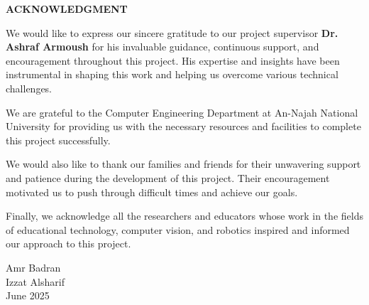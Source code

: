 \begin{center}
    \Large \textbf{ACKNOWLEDGMENT}
    \end{center}
    
    \vspace{1cm}
    
    We would like to express our sincere gratitude to our project supervisor \textbf{Dr. Ashraf Armoush} for his invaluable guidance, continuous support, and encouragement throughout this project. His expertise and insights have been instrumental in shaping this work and helping us overcome various technical challenges.
    
    We are grateful to the Computer Engineering Department at An-Najah National University for providing us with the necessary resources and facilities to complete this project successfully.
    
    We would also like to thank our families and friends for their unwavering support and patience during the development of this project. Their encouragement motivated us to push through difficult times and achieve our goals.

    Finally, we acknowledge all the researchers and educators whose work in the fields of educational technology, computer vision, and robotics inspired and informed our approach to this project.
    
    \vspace{2cm}
    
    \begin{flushright}
    Amr Badran \\
    Izzat Alsharif \\
    June 2025
    \end{flushright}